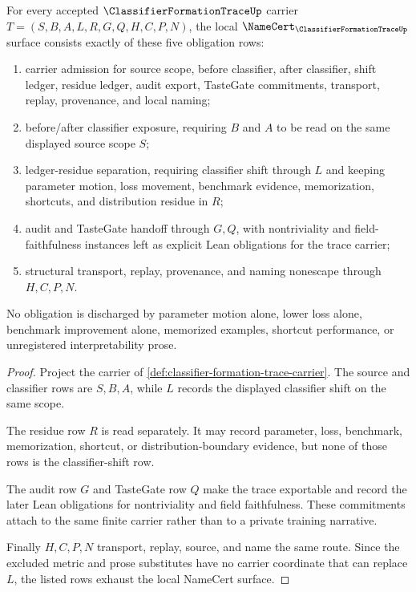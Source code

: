 \begin{theorem}
\label{thm:classifier-formation-trace-namecert-obligations}
For every accepted $\ClassifierFormationTraceUp$ carrier $T=(S,B,A,L,R,G,Q,H,C,P,N)$, the local $\NameCert_{\ClassifierFormationTraceUp}$ surface consists exactly of these five obligation rows:
\begin{enumerate}
\item carrier admission for source scope, before classifier, after classifier, shift ledger, residue ledger, audit export, TasteGate commitments, transport, replay, provenance, and local naming;
\item before/after classifier exposure, requiring $B$ and $A$ to be read on the same displayed source scope $S$;
\item ledger-residue separation, requiring classifier shift through $L$ and keeping parameter motion, loss movement, benchmark evidence, memorization, shortcuts, and distribution residue in $R$;
\item audit and TasteGate handoff through $G,Q$, with nontriviality and field-faithfulness instances left as explicit Lean obligations for the trace carrier;
\item structural transport, replay, provenance, and naming nonescape through $H,C,P,N$.
\end{enumerate}
No obligation is discharged by parameter motion alone, lower loss alone, benchmark improvement alone, memorized examples, shortcut performance, or unregistered interpretability prose.
\end{theorem}
\begin{proof}
Project the carrier of \autoref{def:classifier-formation-trace-carrier}. The source and classifier rows are $S,B,A$, while $L$ records the displayed classifier shift on the same scope.

The residue row $R$ is read separately. It may record parameter, loss, benchmark, memorization, shortcut, or distribution-boundary evidence, but none of those rows is the classifier-shift row.

The audit row $G$ and TasteGate row $Q$ make the trace exportable and record the later Lean obligations for nontriviality and field faithfulness. These commitments attach to the same finite carrier rather than to a private training narrative.

Finally $H,C,P,N$ transport, replay, source, and name the same route. Since the excluded metric and prose substitutes have no carrier coordinate that can replace $L$, the listed rows exhaust the local NameCert surface.
\end{proof}

